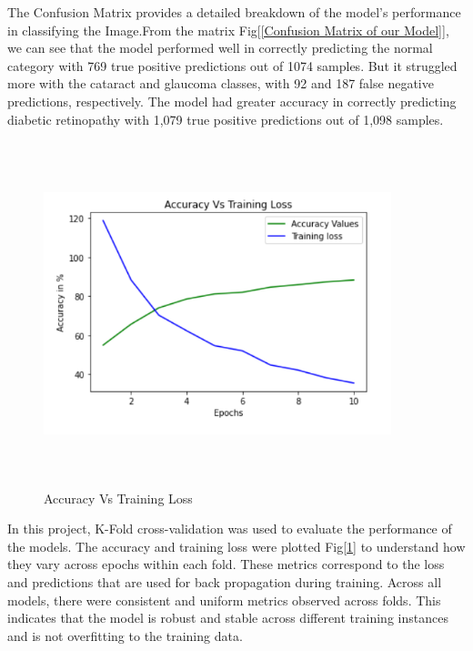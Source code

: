 \documentclass[conference]{IEEEtran}
\begin{document}
\vspace{5pt}
The Confusion Matrix provides a detailed breakdown of the model's performance in classifying the Image.From the matrix Fig[\ref{Confusion Matrix of our Model}], we can see that the model performed well in correctly predicting the normal category with 769 true positive predictions out of 1074 samples. But it struggled more with the cataract and glaucoma classes, with 92 and 187 false negative predictions, respectively. The model had greater accuracy in correctly predicting diabetic retinopathy with 1,079 true positive predictions out of 1,098 samples.


\begin{figure}[ht]
    \centering
    \includegraphics[width=0.9\textwidth,height = 10cm]{Images/Accuracy Vs Training Loss.png}
    \caption{Accuracy Vs Training Loss}
    \label{fig:Accuracy Vs Training Loss}
\end{figure}


\vspace{5pt}
In this project, K-Fold cross-validation was used to evaluate the performance of the models. The accuracy and training loss were plotted Fig[\ref{fig:Accuracy Vs Training Loss}] to understand how they vary across epochs within each fold. These metrics correspond to the loss and predictions that are used for back propagation during training. Across all models, there were consistent and uniform metrics observed across folds. This indicates that the model is robust and stable across different training instances and is not overfitting to the training data.
\end{document}
